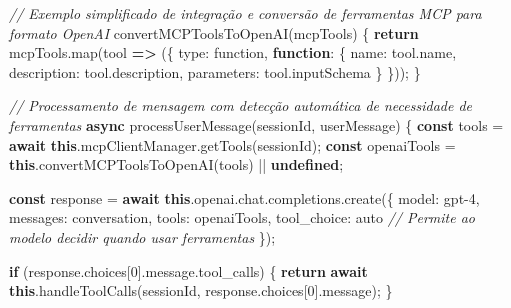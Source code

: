 \documentclass[
]{article}
\newenvironment{Shaded}{}{}
\newcommand{\AttributeTok}[1]{\textcolor[rgb]{0.49,0.56,0.16}{#1}}
\newcommand{\CommentTok}[1]{\textcolor[rgb]{0.38,0.63,0.69}{\textit{#1}}}
\newcommand{\ControlFlowTok}[1]{\textcolor[rgb]{0.00,0.44,0.13}{\textbf{#1}}}
\newcommand{\DataTypeTok}[1]{\textcolor[rgb]{0.56,0.13,0.00}{#1}}
\newcommand{\DecValTok}[1]{\textcolor[rgb]{0.25,0.63,0.44}{#1}}
\newcommand{\FunctionTok}[1]{\textcolor[rgb]{0.02,0.16,0.49}{#1}}
\newcommand{\KeywordTok}[1]{\textcolor[rgb]{0.00,0.44,0.13}{\textbf{#1}}}
\newcommand{\NormalTok}[1]{#1}
\newcommand{\OperatorTok}[1]{\textcolor[rgb]{0.40,0.40,0.40}{#1}}
\newcommand{\StringTok}[1]{\textcolor[rgb]{0.25,0.44,0.63}{#1}}
\begin{document}
\begin{Shaded}
\begin{Highlighting}[]
\CommentTok{// Exemplo simplificado de integração e conversão de ferramentas MCP para formato OpenAI}
\FunctionTok{convertMCPToolsToOpenAI}\NormalTok{(mcpTools) \{}
  \ControlFlowTok{return}\NormalTok{ mcpTools}\OperatorTok{.}\FunctionTok{map}\NormalTok{(tool }\KeywordTok{=\textgreater{}}\NormalTok{ (\{}
    \DataTypeTok{type}\OperatorTok{:} \StringTok{\textquotesingle{}function\textquotesingle{}}\OperatorTok{,}
    \KeywordTok{function}\OperatorTok{:}\NormalTok{ \{}
      \DataTypeTok{name}\OperatorTok{:}\NormalTok{ tool}\OperatorTok{.}\AttributeTok{name}\OperatorTok{,}
      \DataTypeTok{description}\OperatorTok{:}\NormalTok{ tool}\OperatorTok{.}\AttributeTok{description}\OperatorTok{,}
      \DataTypeTok{parameters}\OperatorTok{:}\NormalTok{ tool}\OperatorTok{.}\AttributeTok{inputSchema}
\NormalTok{    \}}
\NormalTok{  \}))}\OperatorTok{;}
\NormalTok{\}}

\CommentTok{// Processamento de mensagem com detecção automática de necessidade de ferramentas}
\KeywordTok{async} \FunctionTok{processUserMessage}\NormalTok{(sessionId}\OperatorTok{,}\NormalTok{ userMessage) \{}
  \KeywordTok{const}\NormalTok{ tools }\OperatorTok{=} \ControlFlowTok{await} \KeywordTok{this}\OperatorTok{.}\AttributeTok{mcpClientManager}\OperatorTok{.}\FunctionTok{getTools}\NormalTok{(sessionId)}\OperatorTok{;}
  \KeywordTok{const}\NormalTok{ openaiTools }\OperatorTok{=} \KeywordTok{this}\OperatorTok{.}\FunctionTok{convertMCPToolsToOpenAI}\NormalTok{(tools) }\OperatorTok{||} \KeywordTok{undefined}\OperatorTok{;}
  
  \KeywordTok{const}\NormalTok{ response }\OperatorTok{=} \ControlFlowTok{await} \KeywordTok{this}\OperatorTok{.}\AttributeTok{openai}\OperatorTok{.}\AttributeTok{chat}\OperatorTok{.}\AttributeTok{completions}\OperatorTok{.}\FunctionTok{create}\NormalTok{(\{}
    \DataTypeTok{model}\OperatorTok{:} \StringTok{\textquotesingle{}gpt{-}4\textquotesingle{}}\OperatorTok{,}
    \DataTypeTok{messages}\OperatorTok{:}\NormalTok{ conversation}\OperatorTok{,}
    \DataTypeTok{tools}\OperatorTok{:}\NormalTok{ openaiTools}\OperatorTok{,}
    \DataTypeTok{tool\_choice}\OperatorTok{:} \StringTok{\textquotesingle{}auto\textquotesingle{}}  \CommentTok{// Permite ao modelo decidir quando usar ferramentas}
\NormalTok{  \})}\OperatorTok{;}
  
  \ControlFlowTok{if}\NormalTok{ (response}\OperatorTok{.}\AttributeTok{choices}\NormalTok{[}\DecValTok{0}\NormalTok{]}\OperatorTok{.}\AttributeTok{message}\OperatorTok{.}\AttributeTok{tool\_calls}\NormalTok{) \{}
    \ControlFlowTok{return} \ControlFlowTok{await} \KeywordTok{this}\OperatorTok{.}\FunctionTok{handleToolCalls}\NormalTok{(sessionId}\OperatorTok{,}\NormalTok{ response}\OperatorTok{.}\AttributeTok{choices}\NormalTok{[}\DecValTok{0}\NormalTok{]}\OperatorTok{.}\AttributeTok{message}\NormalTok{)}\OperatorTok{;}
\NormalTok{  \}}
  

\end{Highlighting}
\end{Shaded}
\end{document}

